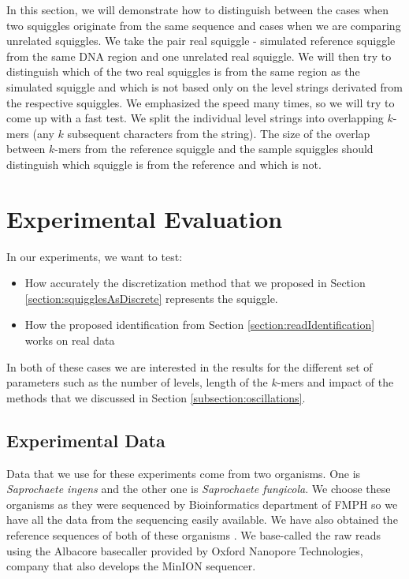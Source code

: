 In this section, we will demonstrate how to distinguish between the cases when two squiggles
originate from the same sequence and cases when we are comparing unrelated squiggles.
We take the pair real squiggle - simulated reference squiggle from the same DNA region and one unrelated real squiggle.
We will then try to distinguish which of the two real squiggles is from the same region as the simulated squiggle
and which is not based only on the level strings derivated from the respective squiggles. We
emphasized the speed many times, so we will try to come up with a fast test.
We split the individual level strings into overlapping $k$-mers (any $k$ subsequent
characters from the string). The size of the overlap between $k$-mers from the reference
squiggle and the sample squiggles should distinguish which squiggle is from the reference and which is not.

\section{Experimental Evaluation}

In our experiments, we want to test:

\begin{itemize}
    \item How accurately the discretization method that we proposed in Section \ref{section:squigglesAsDiscrete} represents the squiggle.
    \item How the proposed identification from Section \ref{section:readIdentification} works on real data
\end{itemize}

In both of these cases we are interested in the results for the different set of parameters
such as the number of levels, length of the $k$-mers and impact of the methods that we
discussed in Section \ref{subsection:oscillations}.

\subsection{Experimental Data}
\label{section:data}

Data that we use for these experiments come from two organisms. One is \emph{Saprochaete ingens} and
the other one is \emph{Saprochaete fungicola}. We choose these
organisms as they were sequenced by Bioinformatics department of
FMPH so we have all the data from the sequencing easily available.
We have also obtained the reference sequences of both of these organisms \cite{hodorova2019genome} \cite{brejova2019genome}.
We base-called the raw reads using the Albacore basecaller provided by Oxford Nanopore Technologies, company that also develops the MinION sequencer.

